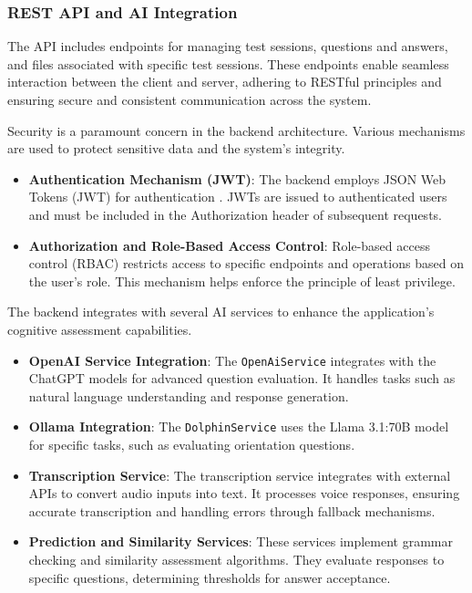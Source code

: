 \subsubsection{REST API and AI Integration}
The API includes endpoints for managing test sessions, questions and answers, and files associated with specific test sessions. These endpoints enable seamless interaction between the client and server, adhering to RESTful principles and ensuring secure and consistent communication across the system.

Security is a paramount concern in the backend architecture. Various mechanisms are used to protect sensitive data and the system's integrity.
\begin{itemize}
    \item \textbf{Authentication Mechanism (JWT)}: The backend employs JSON Web Tokens (JWT) for authentication \cite{Jones2015}. JWTs are issued to authenticated users and must be included in the Authorization header of subsequent requests.
    \item \textbf{Authorization and Role-Based Access Control}: Role-based access control (RBAC) restricts access to specific endpoints and operations based on the user's role. This mechanism helps enforce the principle of least privilege.
\end{itemize}

The backend integrates with several AI services to enhance the application's cognitive assessment capabilities.
\begin{itemize}
    \item \textbf{OpenAI Service Integration}: The \texttt{OpenAiService} integrates with the ChatGPT models for advanced question evaluation. It handles tasks such as natural language understanding and response generation.
    \item \textbf{Ollama Integration}: The \texttt{DolphinService} uses the Llama 3.1:70B model for specific tasks, such as evaluating orientation questions.
    \item \textbf{Transcription Service}: The transcription service integrates with external APIs to convert audio inputs into text. It processes voice responses, ensuring accurate transcription and handling errors through fallback mechanisms.
    \item \textbf{Prediction and Similarity Services}: These services implement grammar checking and similarity assessment algorithms. They evaluate responses to specific questions, determining thresholds for answer acceptance.
\end{itemize}

